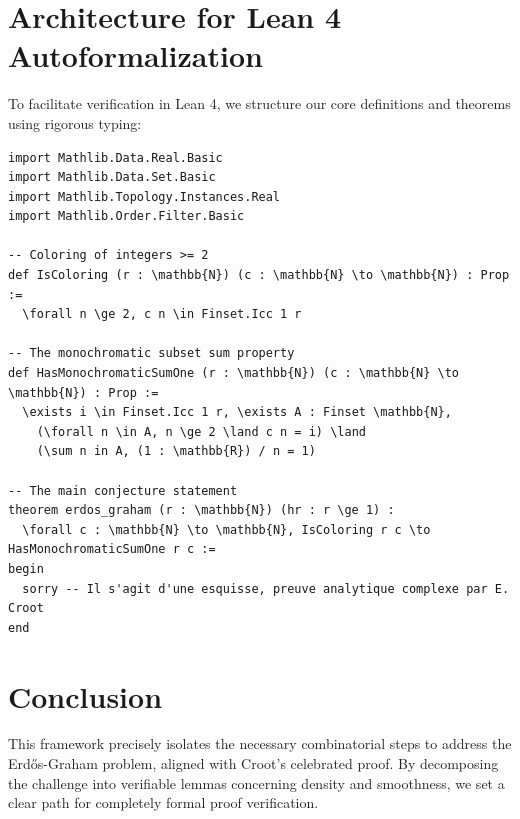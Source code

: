 \documentclass[12pt,a4paper]{article}
\begin{document}
\section{Architecture for Lean 4 Autoformalization}
To facilitate verification in Lean 4, we structure our core definitions and theorems using rigorous typing:

\begin{verbatim}
import Mathlib.Data.Real.Basic
import Mathlib.Data.Set.Basic
import Mathlib.Topology.Instances.Real
import Mathlib.Order.Filter.Basic

-- Coloring of integers >= 2
def IsColoring (r : \mathbb{N}) (c : \mathbb{N} \to \mathbb{N}) : Prop :=
  \forall n \ge 2, c n \in Finset.Icc 1 r

-- The monochromatic subset sum property
def HasMonochromaticSumOne (r : \mathbb{N}) (c : \mathbb{N} \to \mathbb{N}) : Prop :=
  \exists i \in Finset.Icc 1 r, \exists A : Finset \mathbb{N},
    (\forall n \in A, n \ge 2 \land c n = i) \land
    (\sum n in A, (1 : \mathbb{R}) / n = 1)

-- The main conjecture statement
theorem erdos_graham (r : \mathbb{N}) (hr : r \ge 1) :
  \forall c : \mathbb{N} \to \mathbb{N}, IsColoring r c \to HasMonochromaticSumOne r c :=
begin
  sorry -- Il s'agit d'une esquisse, preuve analytique complexe par E. Croot
end
\end{verbatim}

\section{Conclusion}
This framework precisely isolates the necessary combinatorial steps to address the Erd\H{o}s-Graham problem, aligned with Croot's celebrated proof. By decomposing the challenge into verifiable lemmas concerning density and smoothness, we set a clear path for completely formal proof verification.
\end{document}
